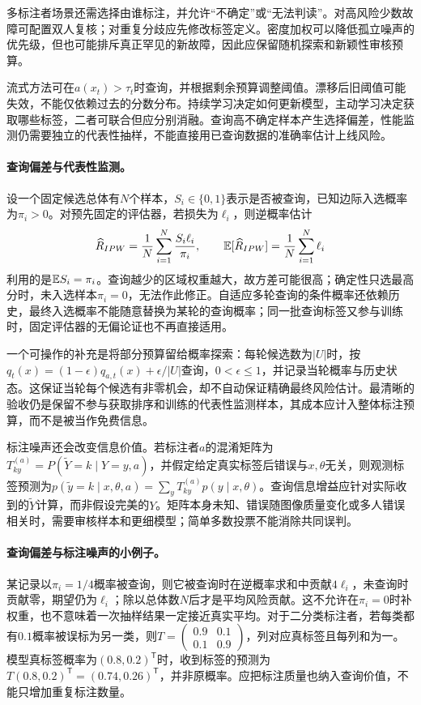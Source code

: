 多标注者场景还需选择由谁标注，并允许“不确定”或“无法判读”。对高风险少数故障可配置双人复核；对重复分歧应先修改标签定义。密度加权可以降低孤立噪声的优先级，但也可能排斥真正罕见的新故障，因此应保留随机探索和新颖性审核预算。

流式方法可在$a(x_t)>\tau_t$时查询，并根据剩余预算调整阈值。漂移后旧阈值可能失效，不能仅依赖过去的分数分布。持续学习决定如何更新模型，主动学习决定获取哪些标签，二者可联合但应分别消融。查询高不确定样本产生选择偏差，性能监测仍需要独立的代表性抽样，不能直接用已查询数据的准确率估计上线风险。

\paragraph{查询偏差与代表性监测。}
设一个固定候选总体有$N$个样本，$S_i\in\{0,1\}$表示是否被查询，已知边际入选概率为$\pi_i>0$。对预先固定的评估器，若损失为$\ell_i$，则逆概率估计
\begin{equation}
 \widehat R_{IPW}=\frac1N\sum_{i=1}^N\frac{S_i\ell_i}{\pi_i},\qquad
 \mathbb{E}[\widehat R_{IPW}]=\frac1N\sum_{i=1}^N\ell_i
\end{equation}
利用的是$\mathbb{E} S_i=\pi_i$。查询越少的区域权重越大，故方差可能很高；确定性只选最高分时，未入选样本$\pi_i=0$，无法作此修正。自适应多轮查询的条件概率还依赖历史，最终入选概率不能随意替换为某轮的查询概率；同一批查询标签又参与训练时，固定评估器的无偏论证也不再直接适用。

一个可操作的补充是将部分预算留给概率探索：每轮候选数为$|U|$时，按$q_t(x)=(1-\epsilon)q_{a,t}(x)+\epsilon/|U|$查询，$0<\epsilon\leq1$，并记录当轮概率与历史状态。这保证当轮每个候选有非零机会，却不自动保证精确最终风险估计。最清晰的验收仍是保留不参与获取排序和训练的代表性监测样本，其成本应计入整体标注预算，而不是被当作免费信息。

标注噪声还会改变信息价值。若标注者$a$的混淆矩阵为$T^{(a)}_{ky}=P(\widetilde Y=k\mid Y=y,a)$，并假定给定真实标签后错误与$x,\theta$无关，则观测标签预测为$p(\widetilde y=k\mid x,\theta,a)=\sum_yT^{(a)}_{ky}p(y\mid x,\theta)$。查询信息增益应针对实际收到的$\widetilde Y$计算，而非假设完美的$Y$。矩阵本身未知、错误随图像质量变化或多人错误相关时，需要审核样本和更细模型；简单多数投票不能消除共同误判。

\paragraph{查询偏差与标注噪声的小例子。}
某记录以$\pi_i=1/4$概率被查询，则它被查询时在逆概率求和中贡献$4\ell_i$，未查询时贡献零，期望仍为$\ell_i$；除以总体数$N$后才是平均风险贡献。这不允许在$\pi_i=0$时补权重，也不意味着一次抽样结果一定接近真实平均。对于二分类标注者，若每类都有$0.1$概率被误标为另一类，则$T=\left(\begin{smallmatrix}0.9&0.1\\0.1&0.9\end{smallmatrix}\right)$，列对应真标签且每列和为一。模型真标签概率为$(0.8,0.2)^{\mathsf T}$时，收到标签的预测为$T(0.8,0.2)^{\mathsf T}=(0.74,0.26)^{\mathsf T}$，并非原概率。应把标注质量也纳入查询价值，不能只增加重复标注数量。

